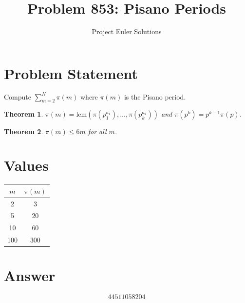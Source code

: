 \documentclass[11pt]{article}
\title{Problem 853: Pisano Periods}
\author{Project Euler Solutions}
\date{}
\newtheorem{theorem}{Theorem}
\begin{document}
\maketitle
\section{Problem Statement}
Compute $\sum_{m=2}^{N}\pi(m)$ where $\pi(m)$ is the Pisano period.
\begin{theorem}
$\pi(m) = \mathrm{lcm}(\pi(p_1^{a_1}), \ldots, \pi(p_k^{a_k}))$ and $\pi(p^k) = p^{k-1}\pi(p)$.
\end{theorem}
\begin{theorem}
$\pi(m) \le 6m$ for all $m$.
\end{theorem}
\section{Values}
\begin{center}
\begin{tabular}{cc} \toprule $m$ & $\pi(m)$ \\ \midrule 2 & 3 \\ 5 & 20 \\ 10 & 60 \\ 100 & 300 \\ \bottomrule \end{tabular}
\end{center}
\section{Answer}

\[
\boxed{44511058204}
\]
\end{document}
